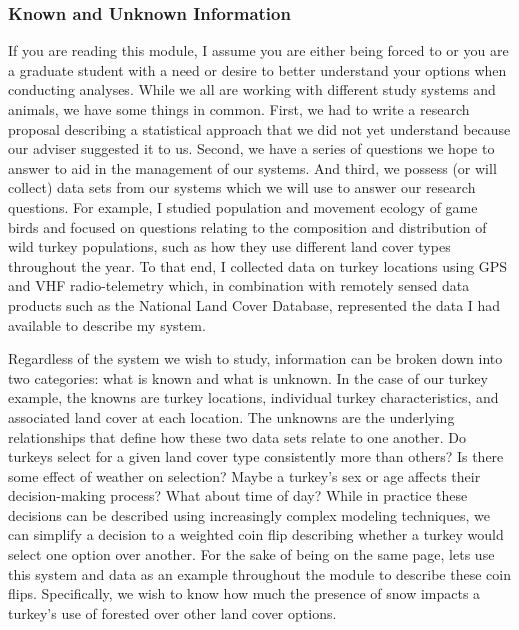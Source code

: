 \documentclass[
]{article}
\begin{document}
\hypertarget{known-and-unknown-information}{%
\subsubsection{Known and Unknown
Information}\label{known-and-unknown-information}}

If you are reading this module, I assume you are either being forced to
or you are a graduate student with a need or desire to better understand
your options when conducting analyses. While we all are working with
different study systems and animals, we have some things in common.
First, we had to write a research proposal describing a statistical
approach that we did not yet understand because our adviser suggested it
to us. Second, we have a series of questions we hope to answer to aid in
the management of our systems. And third, we possess (or will collect)
data sets from our systems which we will use to answer our research
questions. For example, I studied population and movement ecology of
game birds and focused on questions relating to the composition and
distribution of wild turkey populations, such as how they use different
land cover types throughout the year. To that end, I collected data on
turkey locations using GPS and VHF radio-telemetry which, in combination
with remotely sensed data products such as the National Land Cover
Database, represented the data I had available to describe my system.

Regardless of the system we wish to study, information can be broken
down into two categories: what is known and what is unknown. In the case
of our turkey example, the knowns are turkey locations, individual
turkey characteristics, and associated land cover at each location. The
unknowns are the underlying relationships that define how these two data
sets relate to one another. Do turkeys select for a given land cover
type consistently more than others? Is there some effect of weather on
selection? Maybe a turkey's sex or age affects their decision-making
process? What about time of day? While in practice these decisions can
be described using increasingly complex modeling techniques, we can
simplify a decision to a weighted coin flip describing whether a turkey
would select one option over another. For the sake of being on the same
page, lets use this system and data as an example throughout the module
to describe these coin flips. Specifically, we wish to know how much the
presence of snow impacts a turkey's use of forested over other land
cover options.
\end{document}
